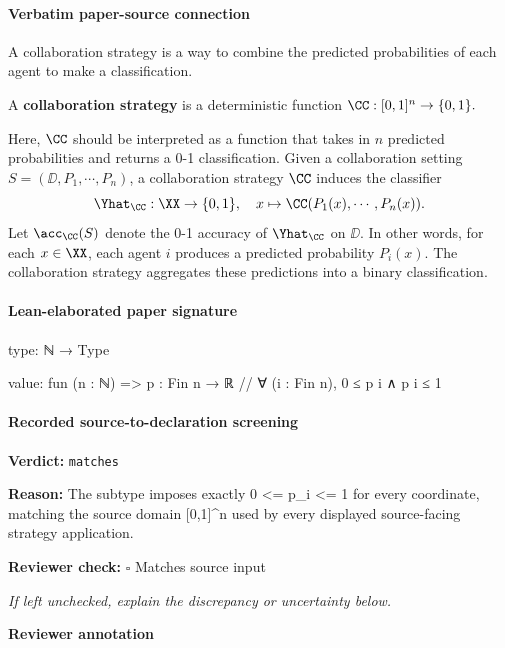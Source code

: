 \documentclass[10pt]{article}
\newcommand{\reviewerbox}{%
  \par\noindent\fbox{\parbox{0.96\linewidth}{\rule{0pt}{0.38in}}}\par
}
\newcommand{\reviewmatch}[1]{%
  \par\noindent\textbf{Reviewer check:} $\square$\; #1\par
  \noindent\emph{If left unchecked, explain the discrepancy or uncertainty below.}\par
}
\begin{document}
\paragraph{Verbatim paper-source connection}
\begin{ReviewVerbatim}
A collaboration strategy is a way to combine the predicted probabilities of each agent to make a classification.
\begin{definition}
A \textbf{collaboration strategy} is a deterministic function $\CC: [0,1]^n \rightarrow \{0,1\}.$
\end{definition}
Here, $\CC$ should be interpreted as a function that takes in $n$ predicted probabilities and returns a 0-1 classification. Given a collaboration setting $S=(\DD, P_1, \cdots, P_n)$, a collaboration strategy $\CC$ induces the classifier
\begin{equation}
    \Yhat_\CC: \XX \rightarrow \{0,1\},\quad x \mapsto \CC(P_1(x),\cdots,P_n(x)).
\end{equation}
Let $\acc_\CC(S)$ denote the 0-1 accuracy of $\Yhat_\CC$ on $\DD$. In other words, for each $x\in \XX$, each agent $i$ produces a predicted probability $P_i(x).$ The collaboration strategy aggregates these predictions into a binary classification.
\end{ReviewVerbatim}



\paragraph{Lean-elaborated paper signature}
\begin{ReviewVerbatim}
type:
ℕ → Type

value:
fun (n : ℕ) => { p : Fin n → ℝ // ∀ (i : Fin n), 0 ≤ p i ∧ p i ≤ 1 }
\end{ReviewVerbatim}


\paragraph{Recorded source-to-declaration screening}
\textbf{Verdict:} \texttt{matches}
\\
{\raggedright
\textbf{Reason:} The subtype imposes exactly 0 <= p\_\allowbreak{}i <= 1 for every coordinate, matching the source domain [0,1]\textasciicircum{}n used by every displayed source-\allowbreak{}facing strategy application.\allowbreak{}
\par}
\reviewmatch{Matches source input}
\noindent\textbf{Reviewer annotation}\par
\reviewerbox
\clearpage
\hypertarget{paper-prerequisite-b970619f8c41551c}{}
\end{document}
